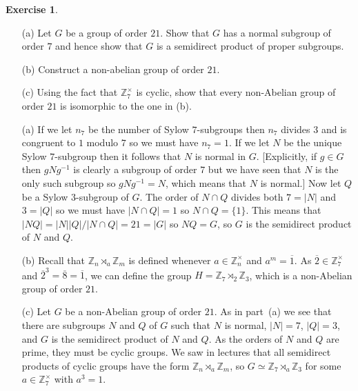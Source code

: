 \documentclass{amsart}
\renewcommand{\:}{\colon}
\newcommand{\ov}{\overline}
\newcommand{\tm}{\times}
\newcommand{\Z}{\mathbb{Z}}
\theoremstyle{definition}
\newtheorem{exercise}{Exercise}
\newenvironment{solution}{{\noindent\bf Solution:}}{}
\begin{document}
\begin{exercise}
\begin{itemize}
 \item[(a)] Let $G$ be a group of order $21$.  Show that $G$ has a
  normal subgroup of order $7$ and hence show that $G$ is a semidirect
  product of proper subgroups.
 \item[(b)] Construct a non-abelian group of order $21$.
 \item[(c)] Using the fact that $\Z_7^\tm$ is cyclic, show that every
  non-Abelian group of order $21$ is isomorphic to the one in (b).
 \end{itemize}
\end{exercise}
\begin{solution}
 \begin{itemize}
 \item[(a)] If we let $n_7$ be the number of Sylow $7$-subgroups then
  $n_7$ divides $3$ and is congruent to $1$ modulo $7$ so we must have
  $n_7=1$.  If we let $N$ be the unique Sylow $7$-subgroup then it
  follows that $N$ is normal in $G$.  [Explicitly, if $g\in G$ then
  $gNg^{-1}$ is clearly a subgroup of order $7$ but we have seen that
  $N$ is the only such subgroup so $gNg^{-1}=N$, which means that $N$
  is normal.]  Now let $Q$ be a Sylow $3$-subgroup of $G$.  The order
  of $N\cap Q$ divides both $7=|N|$ and $3=|Q|$ so we must have
  $|N\cap Q|=1$ so $N\cap Q=\{1\}$.  This means that
  $|NQ|=|N||Q|/|N\cap Q|=21=|G|$ so $NQ=G$, so $G$ is the semidirect
  product of $N$ and $Q$.
 \item[(b)] Recall that $\Z_n\rtimes_a\Z_m$ is defined whenever
  $a\in\Z_n^\tm$ and $a^m=\ov{1}$.  As $\ov{2}\in\Z_7^\tm$ and
  $\ov{2}^3=\ov{8}=\ov{1}$, we can define the group
  $H=\Z_7\rtimes_2\Z_3$, which is a non-Abelian group of order $21$.
 \item[(c)] Let $G$ be a non-Abelian group of order $21$.  As in
  part~(a) we see that there are subgroups $N$ and $Q$ of $G$ such
  that $N$ is normal, $|N|=7$, $|Q|=3$, and $G$ is the semidirect
  product of $N$ and $Q$.  As the orders of $N$ and $Q$ are prime,
  they must be cyclic groups.  We saw in lectures that all semidirect
  products of cyclic groups have the form $\Z_n\rtimes_a\Z_m$, so
  $G\simeq \Z_7\rtimes_a\Z_3$ for some $a\in\Z_7^\tm$ with $a^3=1$.  


\end{itemize}
\end{solution}
\end{document}
